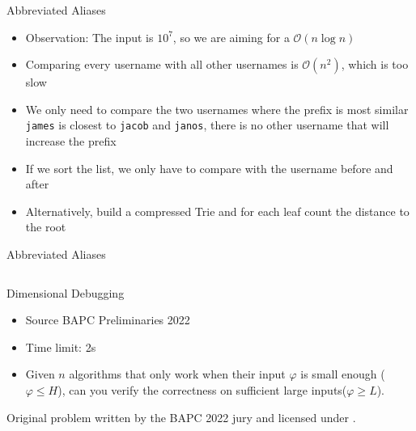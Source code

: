 \documentclass[11pt,pdf, aspectratio=169]{beamer}
\begin{document}
  \begin{frame}{Abbreviated Aliases}
    \begin{itemize}
      \item Observation: The input is $10^7$, so we are aiming for a $\mathcal{O}(n\log{}n)$
      \item Comparing every username with all other usernames is $\mathcal{O}(n^2)$, which is too slow
      \item We only need to compare the two usernames where the prefix is most similar\\
      \texttt{james} is closest to \texttt{jacob} and \texttt{janos}, there is no other username that will increase the prefix
      \item If we sort the list, we only have to compare with the username before and after
      \item Alternatively, build a compressed Trie and for each leaf count the distance to the root
    \end{itemize}
  \end{frame}
  \begin{frame}[containsverbatim]{Abbreviated Aliases}
    \inputminted{python}{code/session-1/python/dapc-a.py}
  \end{frame}

  \begin{frame}{Dimensional Debugging}
    \begin{itemize}
      \item Source BAPC Preliminaries 2022
      \item Time limit: 2s
      \item Given $n$ algorithms that only work when their input $\varphi$ is small enough ($\varphi \leq H$), can you verify the correctness on sufficient large inputs($\varphi \geq L$).
    \end{itemize}
    Original problem written by the BAPC 2022 jury and licensed under \doclicenseLongNameRef.

    \doclicenseImage
  \end{frame}
\end{document}
